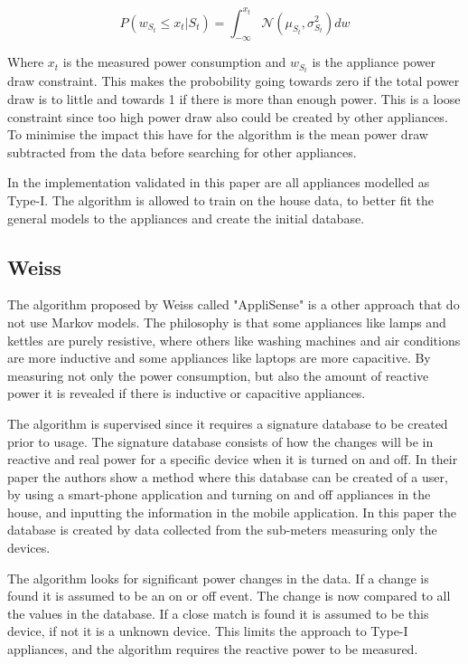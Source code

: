 \begin{equation}
	P(w_{S_t} \leq x_t | S_t ) = \int_{-\infty}^{x_t}  \mathcal{N}( \mu_{S_t} , \sigma_{S_t}^2 ) dw
	\label{EQ:PCA}
\end{equation}

Where $x_t$ is the measured power consumption and $w_{S_t}$ is the appliance power draw constraint. This makes the probobility going towards zero if the total power draw is to little and towards 1 if there is more than enough power. This is a loose constraint since too high power draw also could be created by other appliances. To minimise the impact this have for the algorithm is the mean power draw subtracted from the data before searching for other appliances. 

In the implementation validated in this paper are all appliances modelled as Type-I. The algorithm is allowed to train on the house data, to better fit the general models to the appliances and create the initial database.

\subsection{Weiss}
The algorithm proposed by Weiss called "AppliSense" is a other approach that do not use Markov models\citep{RefWorks:23}. The philosophy is that some appliances like lamps and kettles are purely resistive, where others like washing machines and air conditions are more inductive and some appliances like laptops are more capacitive. By measuring not only the power consumption, but also the amount of reactive power it is revealed if there is inductive or capacitive appliances.

The algorithm is supervised since it requires a signature database to be created prior to usage. The signature database consists of how the changes will be in reactive and real power for a specific device when it is turned on and off. In their paper the authors show a method where this database can be created of a user, by using a smart-phone application and turning on and off appliances in the house, and inputting the information in the mobile application\citep{RefWorks:23}. In this paper the database is created by data collected from the sub-meters measuring only the devices.  

The algorithm looks for significant power changes in the data. If a change is found it is assumed to be an on or off event. The change is now compared to all the values in the database. If a close match is found it is assumed to be this device, if not it is a unknown device. This limits the approach to Type-I appliances, and the algorithm requires the reactive power to be measured. 

